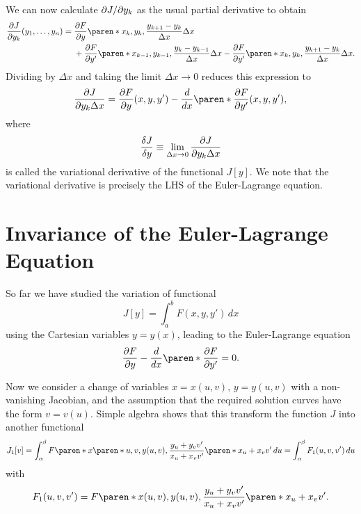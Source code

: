 \documentclass[11pt]{penrose}
\begin{document}
We can now calculate $\partial J / \partial y_k$ as the usual partial derivative to obtain
\begin{align*}
    \frac{\pd J}{\pd y_k} (y_1, \dots, y_n)
    = {} & \frac{\pd F}{\pd y} \paren*{x_k, y_k, \frac{y_{k+1} - y_k}{\Delta x}} \Delta x\\
    &+ \frac{\pd F}{\pd y'} \paren*{x_{k-1}, y_{k-1}, \frac{y_k - y_{k-1}}{\Delta x}} \Delta x
    - \frac{\pd F}{\pd y'} \paren*{x_k, y_k, \frac{y_{k+1} - y_k}{\Delta x}} \Delta x.
\end{align*}
Dividing by $\Delta x$ and taking the limit $\Delta x \to 0$ reduces this expression to
\begin{equation}
    \frac{\pd J}{\pd y_k \Delta x}
    = \frac{\pd F}{\pd y} (x, y, y')
    - \frac{d}{dx} \paren*{ \frac{\pd F}{\pd y'} (x, y, y') },
\end{equation}
where
\begin{equation}
    \frac{\delta J}{\delta y} \equiv \lim_{\Delta x \to 0} \frac{\partial J}{\partial y_k \Delta x}
\end{equation}
is called the variational derivative of the functional $J[y]$. We note that the variational derivative is precisely the LHS of the Euler-Lagrange equation.

\section{Invariance of the Euler-Lagrange Equation}
So far we have studied the variation of functional
\begin{equation}
    J[y] = \int_a^b F(x, y, y') \,dx
\end{equation}
using the Cartesian variables $y = y(x)$, leading to the Euler-Lagrange equation
\begin{equation}
    \frac{\pd F}{\pd y} - \frac{d}{dx}\paren*{\frac{\pd F}{\pd y'}} = 0.
\end{equation}

Now we consider a change of variables $x = x(u, v)$, $y = y(u, v)$ with a non-vanishing Jacobian, and the assumption that the required solution curves have the form $v = v(u)$. Simple algebra shows that this transform the function $J$ into another functional
\begin{equation}
    J_1 [v]
    = \int_\alpha^\beta F\paren*{x\paren*{u, v}, y(u,v), \frac{y_u + y_v v'}{x_u + x_v v'}} \paren*{x_u + x_v v'} \,du
    = \int_\alpha^\beta F_1 (u, v, v') \,du
\end{equation}
with
\begin{equation}
    F_1 (u, v, v')
    = F\paren*{x(u, v), y(u,v), \frac{y_u + y_v v'}{x_u + x_v v'}} \paren*{x_u + x_v v'}.
\end{equation}
\end{document}
